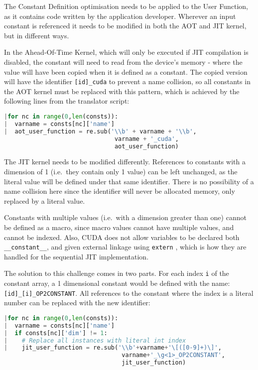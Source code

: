 
\noindent The Constant Definition optimisation needs to be applied to the User Function, as it contains code written by the application developer. Wherever an input constant is referenced it needs to be modified in both the AOT and JIT kernel, but in different ways.

 In the Ahead-Of-Time Kernel, which will only be executed if JIT compilation is disabled, the constant will need to read from the device's memory - where the value will have been copied when it is defined as a constant. The copied version will have the identifier \verb|[id]_cuda| to prevent a name collision, so all constants in the AOT kernel must be replaced with this pattern, which is achieved by the following lines from the translator script:

\begin{lstlisting}[backgroundcolor = \color{lightgray!20}, language=Python]
|for nc in range(0,len(consts)):
|  varname = consts[nc]['name']
|  aot_user_function = re.sub('\\b' + varname + '\\b',
                               varname + '_cuda',
                               aot_user_function)
\end{lstlisting}

 The JIT kernel needs to be modified differently. References to constants with a dimension of 1 (i.e.\ they contain only 1 value) can be left unchanged, as the literal value will be defined under that same identifier. There is no possibility of a name collision here since the identifier will never be allocated memory, only replaced by a literal value.
\par
Constants with multiple values (i.e.\ with a dimension greater than one) cannot be defined as a macro, since macro values cannot have multiple values, and cannot be indexed. Also, CUDA does not allow variables to be declared both \verb|__constant__|, and given external linkage using \verb|extern| \cite[p126]{guide}, which is how they are handled for the sequential JIT implementation.
\par
The solution to this challenge comes in two parts. For each index \verb|i| of the constant array, a 1 dimensional constant would be defined with the name:\\ \verb|[id]_[i]_OP2CONSTANT|. All references to the constant where the index is a literal number can be replaced with the new identifier:
\begin{lstlisting}[backgroundcolor = \color{lightgray!20}, language=Python]
|for nc in range(0,len(consts)):
|  varname = consts[nc]['name']
|  if consts[nc]['dim'] != 1:
|    # Replace all instances with literal int index
|    jit_user_function = re.sub('\\b'+varname+'\[([0-9]+)\]',
                                 varname+'_\g<1>_OP2CONSTANT',
                                 jit_user_function)

\end{lstlisting}


